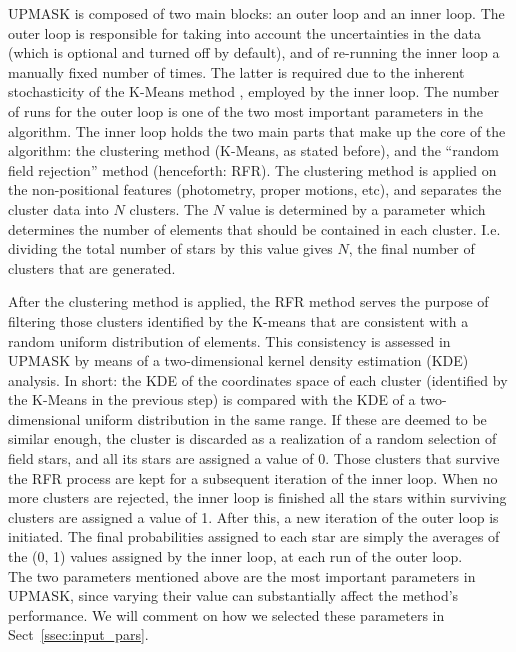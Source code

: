 \documentclass{aa}
\begin{document}
 UPMASK is composed of two main blocks: an outer loop and an inner
 loop. The outer loop is responsible for taking into account the uncertainties
 in the data (which is optional and turned off by default), and of re-running
 the inner loop a manually fixed number of times. The latter is required due
 to the inherent stochasticity of the K-Means method \citep{macqueen1967},
 employed by the inner loop. The number of runs for the outer loop is one of
 the two most important parameters in the algorithm.
 The inner loop holds the two main parts that make up the core of the
 algorithm: the clustering method (K-Means, as stated before), and the
 ``random field rejection'' method (henceforth: RFR).
 The clustering method is applied on the non-positional features (photometry,
 proper motions, etc), and separates the cluster data into $N$ clusters. The
 $N$ value is determined by a parameter
 which determines the number of elements that should be
 contained in each cluster. I.e. dividing the total number of stars by this
 value gives $N$, the final number of clusters that are generated.
 
 After the clustering method is applied, the RFR method serves the purpose of
 filtering those clusters identified by the K-means that are consistent
 with a random uniform distribution of elements. This consistency is assessed
 in UPMASK by means of a two-dimensional kernel density estimation (KDE)
 analysis. In short: the KDE of the coordinates space of each cluster 
 (identified by the K-Means in the previous step) is compared with the KDE of a
 two-dimensional uniform distribution in the same range. If these are deemed
 to be similar enough, the cluster is discarded as a realization of a random
 selection of field stars, and all its stars are assigned a value of 0. Those
 clusters that survive the RFR process are kept for a subsequent iteration of
 the inner loop. When no more clusters are rejected, the inner loop is finished
 all the stars within surviving clusters are assigned a value of 1. After this,
 a new iteration of the outer loop is initiated.
 The final probabilities assigned to each star are simply the averages of the
 (0, 1) values assigned by the inner loop, at each run of the outer loop.\\

 The two parameters mentioned above are the most important parameters in
 UPMASK, since varying their value can substantially affect the
 method's performance. We will comment on how we selected these
 parameters in Sect~\ref{ssec:input_pars}.
\end{document}
